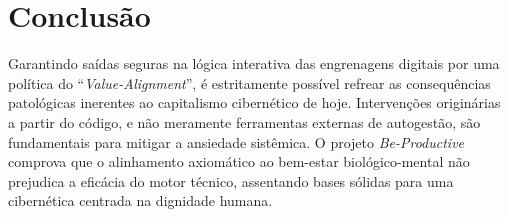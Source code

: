 \documentclass[12pt, a4paper]{article}
\begin{document}
\section{Conclusão}

Garantindo saídas seguras na lógica interativa das engrenagens digitais por uma política do ``\textit{Value-Alignment}'', é estritamente possível refrear as consequências patológicas inerentes ao capitalismo cibernético de hoje. Intervenções originárias a partir do código, e não meramente ferramentas externas de autogestão, são fundamentais para mitigar a ansiedade sistêmica. O projeto \textit{Be-Productive} comprova que o alinhamento axiomático ao bem-estar biológico-mental não prejudica a eficácia do motor técnico, assentando bases sólidas para uma cibernética centrada na dignidade humana.

\printbibliography
\end{document}
